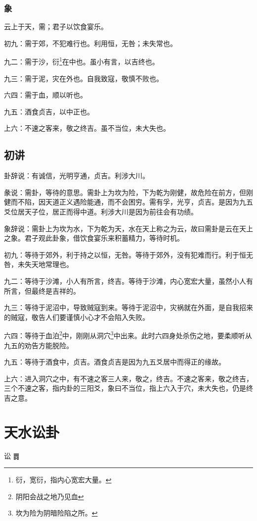 \documentclass[12pt,oneside]{book}
\begin{document}
\subsection{象}
云上于天，需；君子以饮食宴乐。

初九：需于郊，不犯难行也。利用恒，无咎；未失常也。

九二：需于沙，衍\footnote{衍，宽衍，指内心宽宏大量。}在中也。虽小有言，以吉终也。

九三：需于泥，灾在外也。自我致寇，敬慎不败也。

六四：需于血，顺以听也。

九五：酒食贞吉，以中正也。

上六：不速之客来，敬之终吉。虽不当位，未大失也。

\section{初讲}
卦辞说：有诚信，光明亨通，贞吉。利涉大川。

彖说：需卦，等待的意思。需卦上为坎为险，下为乾为刚健，故危险在前方，但刚健而不陷，因天道正义遇险能通，而不会困穷。需有孚，光亨，贞吉。是因为九五爻位居天子位，居正而得中道。利涉大川是因为前往会有功绩。

象辞说：需卦上为坎为水，下为乾为天，水在天上称之为云，故曰需卦是云在天上之象。君子观此卦象，借饮食宴乐来积蓄精力，等待时机。


初九：等待于郊外，利于持之以恒，无咎。等待于郊外，没有犯难而行。利于恒无咎，未失天地常理也。

九二：等待于沙滩，小人有所言，终吉。等待于沙滩，内心宽宏大量，虽然小人有所言，但最终是吉祥的。

九三：等待于泥沼中，导致贼寇到来。等待于泥沼中，灾祸就在外面，是自我招来的贼寇，敬告人们要谨慎小心才不会陷入失败。

六四：等待于血泊\footnote{阴阳会战之地乃见血}中，刚刚从洞穴\footnote{坎为险为阴暗险陷之所。}中出来。此时六四身处杀伤之地，要柔顺听从九五的劝告方能脱险。

九五：等待于酒食中，贞吉。酒食贞吉是因为九五爻居中而得正的缘故。

上六：进入洞穴之中，有不速之客三人来，敬之，终吉。不速之客来，敬之终吉，三个不速之客，指内卦的三阳爻，象曰不当位，指上六入于穴，未大失也，仍是终吉之意。



\chapter{天水讼卦}
讼 {\Large ䷅}
\end{document}
